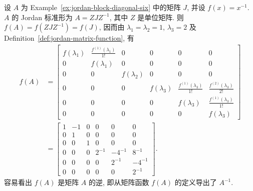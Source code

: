 \begin{Example}\label{ex:inverse-jordan-matrix-function}
{设 $A$ 为 Example~\ref{ex:jordan-block-diagonal-six} 中的矩阵 $J$, 并设 $f(x)=x^{-1}$. $A$ 的 Jordan 标准形为 $A=ZJZ^{-1}$, 其中 $Z$ 是单位矩阵. 则 $f(A)=f(ZJZ^{-1})=f(J)$, 因而由 $\lambda_1=\lambda_2=1$, $\lambda_3=2$ 及 Definition~\ref{def:jordan-matrix-function}, 有}
\[
\begin{aligned}
f(A)&=\left[\begin{array}{cc|c|ccc}f(\lambda_1)&\frac{f^{(1)}(\lambda_1)}{1!}&0&0&0&0\\0&f(\lambda_1)&0&0&0&0\\\hline0&0&f(\lambda_2)&0&0&0\\\hline0&0&0&f(\lambda_3)&\frac{f^{(1)}(\lambda_3)}{1!}&\frac{f^{(2)}(\lambda_3)}{2!}\\0&0&0&0&f(\lambda_3)&\frac{f^{(1)}(\lambda_3)}{1!}\\0&0&0&0&0&f(\lambda_3)\end{array}\right]\\
&=\left[\begin{array}{cc|c|ccc}1&-1&0&0&0&0\\0&1&0&0&0&0\\\hline0&0&1&0&0&0\\\hline0&0&0&2^{-1}&-4^{-1}&8^{-1}\\0&0&0&0&2^{-1}&-4^{-1}\\0&0&0&0&0&2^{-1}\end{array}\right].
\end{aligned}
\]
{容易看出 $f(A)$ 是矩阵 $A$ 的逆, 即从矩阵函数 $f(A)$ 的定义导出了 $A^{-1}$.}
\end{Example}

